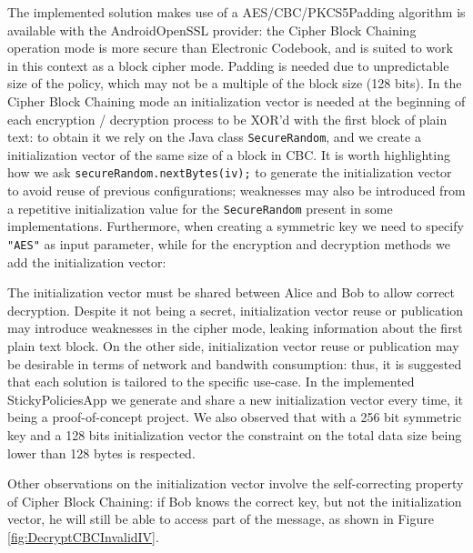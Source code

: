 The implemented solution makes use of a AES/CBC/PKCS5Padding  algorithm is available with the AndroidOpenSSL provider: the Cipher Block Chaining operation mode is more secure than Electronic Codebook, and is suited to work in this context as a block cipher mode. Padding is needed due to unpredictable size of the policy, which may not be a multiple of the block size (128 bits). In the Cipher Block Chaining mode an initialization vector is needed at the beginning of each encryption / decryption process to be XOR'd with the first block of plain text: to obtain it we rely on the Java class \texttt{SecureRandom}, and we create a initialization vector of the same size of a block in CBC. It is worth highlighting how we ask \texttt{secureRandom.nextBytes(iv);} to generate the initialization vector to avoid reuse of previous configurations; weaknesses  may also be introduced from a repetitive initialization value for the \texttt{SecureRandom} present in some implementations. Furthermore, when creating a symmetric key we need to specify \texttt{"AES"} as input parameter, while for the encryption and decryption methods we add the initialization vector:



The initialization vector must be shared between Alice and Bob to allow correct decryption. Despite it not being a secret, initialization vector reuse or publication may introduce weaknesses in the cipher mode, leaking information about the first plain text block. On the other side, initialization vector reuse or publication may be desirable in terms of network and bandwith consumption: thus, it is suggested that each solution is tailored to the specific use-case. In the implemented StickyPoliciesApp we generate and share a new initialization vector every time, it being a proof-of-concept project. We also observed that with a 256 bit symmetric key and a 128 bits initialization vector the constraint on the total data size being lower than 128 bytes is respected.

Other observations on the initialization vector involve the self-correcting property of Cipher Block Chaining: if Bob knows the correct key, but not the initialization vector, he will still be able to access part of the message, as shown in Figure \ref{fig:DecryptCBCInvalidIV}.

